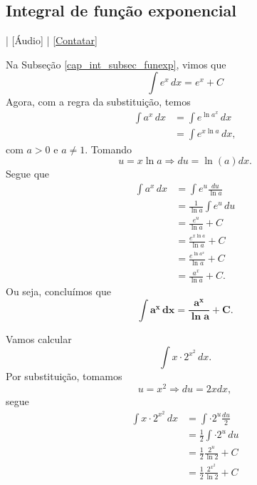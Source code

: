 \subsection{Integral de função exponencial}

\begin{flushright}
  [Vídeo] | [Áudio] | \href{https://phkonzen.github.io/notas/contato.html}{[Contatar]}
\end{flushright}

Na Subseção \ref{cap_int_subsec_funexp}, vimos que
\begin{equation}
  \int e^x\,dx = e^x + C
\end{equation}
Agora, com a regra da substituição, temos
\begin{align}
  \int a^x\,dx &= \int e^{\ln a^x}\,dx \\
               &= \int e^{x\ln a}\,dx,
\end{align}
com $a>0$ e $a\neq 1$. Tomando
\begin{equation}
  u = x\ln a \Rightarrow du = \ln(a)dx.
\end{equation}
Segue que
\begin{align}
  \int a^x\,dx &= \int e^u\frac{du}{\ln a} \\
               &= \frac{1}{\ln a}\int e^u\,du \\
               &= \frac{e^u}{\ln a} + C \\
               &= \frac{e^{x\ln a}}{\ln a} + C \\
               &= \frac{e^{\ln a^x}}{\ln a} + C \\
               &= \frac{a^x}{\ln a} + C.
\end{align}
Ou seja, concluímos que
\begin{equation}
  \pmb{\int a^x\,dx = \frac{a^x}{\ln a} + C}.
\end{equation}

\begin{ex}
  Vamos calcular
  \begin{equation}
    \int x\cdot 2^{x^2}\,dx.
  \end{equation}
  Por substituição, tomamos
  \begin{equation}
    u = x^2 \Rightarrow du = 2xdx,
  \end{equation}
  segue
  \begin{align}
    \int x\cdot 2^{x^2}\,dx &= \int \cdot 2^{u}\frac{du}{2} \\
                            &= \frac{1}{2}\int \cdot 2^{u}\,du \\
                            &= \frac{1}{2}\frac{2^u}{\ln 2} + C \\
                            &= \frac{1}{2}\frac{2^{x^2}}{\ln 2} + C
  \end{align}
\end{ex}

